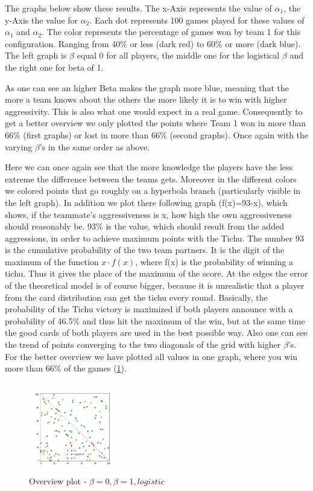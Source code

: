 The graphs below show these results. The x-Axis represents the value of $\alpha_1$, the y-Axis the value for $\alpha_2$. Each dot represents 100 games played for these values of $\alpha_1$ and $\alpha_2$. The color represents the percentage of games won by team 1 for this configuration. Ranging from 40$\%$ or less (dark red) to 60$\%$ or more (dark blue). The left graph is $\beta$ equal 0 for all players, the middle one for the logistical $\beta$ and the right one for beta of 1.

As one can see an higher Beta makes the graph more blue, meaning that the more a team knows about the others the more likely it is to win with higher aggressivity. This is also what one would expect in a real game.
Consequently to get a better overview we only plotted the points where Team 1 won in more than 66$\%$ (first graphs) or lost in more than 66$\%$ (second graphs). Once again with the varying $\beta$'s in the same order as above.

Here we can once again see that the more knowledge the players have the less extreme the difference between the teams gets. Moreover in the different colors we colored points that go roughly on a hyperbola branch (particularly visible in the left graph).  In addition we plot there following graph (f(x)=93-x), which shows, if the teammate's aggressiveness is x, how high the own aggressiveness should reasonably be.
93$\%$ is the value, which should result from the added aggressions, in order to achieve maximum points with the Tichu. The number 93 is the cumulative probability of the two team partners. It is the digit of the maximum of the function $x\cdot f(x)$, where f(x) is the probability of winning a tichu. Thus it gives the place of the maximum of the score.
At the edges the error of the theoretical model is of course bigger, because it is unrealistic that a player from the card distribution can get the tichu every round. 
Basically, the probability of the Tichu victory is maximized if both players announce with a probability of 46.5$\%$ and thus hit the maximum of the win, but at the same time the good cards of both players are used in the best possible way. Also one can see the trend of points converging to the two diagonals of the grid with higher $\beta$'s.
\newpage
For the better overview we have plotted all values in one graph, where you win  more than 66$\%$ of the games (\ref{fig:28}).

\begin{figure}[!ht]
    \centering
    \includegraphics[width=0.35\textwidth]{Bilder/simulation_16}
    \caption{Overview plot - $\beta=0,\beta=1,logistic$}
    \label{fig:28}
\end{figure}


